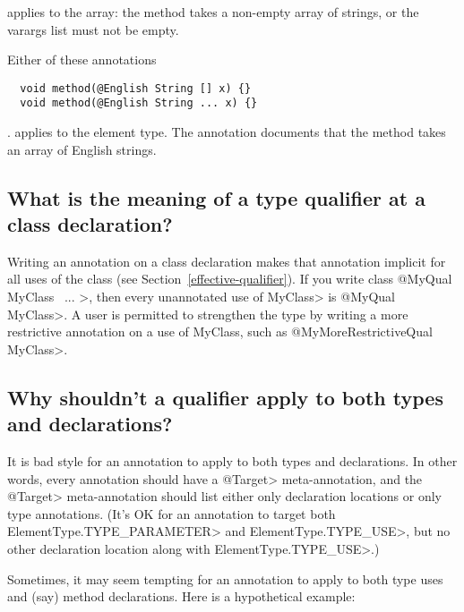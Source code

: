 \noindent
applies to the array:  the method takes a non-empty array of strings, or
the varargs list must not be empty.

Either of these annotations

\begin{Verbatim}
  void method(@English String [] x) {}
  void method(@English String ... x) {}
\end{Verbatim}

\noindent.
applies to the element type. The annotation documents that the method takes an array of English strings.


\subsection{What is the meaning of a type qualifier at a class declaration?\label{faq-type-qualifier-on-class-declaration}}


Writing an annotation on a class declaration makes that annotation implicit
for all uses of the class (see Section~\ref{effective-qualifier}).  If you
write \<class @MyQual MyClass \ttlcb\ ... \ttrcb>, then every unannotated
use of \<MyClass> is \<@MyQual MyClass>.  A user is permitted to strengthen
the type by writing a more restrictive annotation on a use of MyClass, such
as \<@MyMoreRestrictiveQual MyClass>.


\subsection{Why shouldn't a qualifier apply to both types and declarations?\label{faq-no-annotation-on-types-and-declarations}}

It is bad style for an annotation to apply to both types and declarations.
In other words, every annotation should have a \<@Target> meta-annotation,
and the \<@Target> meta-annotation should list either only declaration
locations or only type annotations.  (It's OK for an annotation to target
both \<ElementType.TYPE\_PARAMETER> and \<ElementType.TYPE\_USE>, but no
other declaration location along with \<ElementType.TYPE\_USE>.)

Sometimes, it may seem tempting for an annotation to apply to both type
uses and (say) method declarations.  Here is a hypothetical example:

